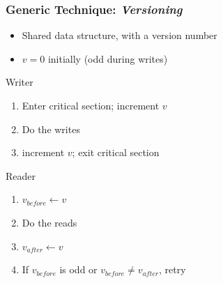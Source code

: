 \documentclass[xcolor={x11names,svgnames},x11names,svgnames]{beamer}
\begin{document}
\begin{frame}[label=versioning]
  \frametitle{Generic Technique: \emph{Versioning}}

  \begin{itemize}
  \item Shared data structure, with a \alert{version number}
  \item $v = 0$ initially (\alert{odd} during writes)
  \end{itemize}

  \begin{alertblock}{Writer}
    \begin{enumerate}
    \item Enter critical section; increment $v$
    \item Do the writes
    \item increment $v$; exit critical section 
    \end{enumerate}
  \end{alertblock}

  \begin{exampleblock}{Reader}
    \begin{enumerate}
    \item $v_{before} \gets v$
    \item Do the reads
    \item $v_{after} \gets v$
    \item If $v_{before}$ is odd or $v_{before} \neq v_{after}$, retry
    \end{enumerate}
  \end{exampleblock}  
\end{frame}

\end{document}
